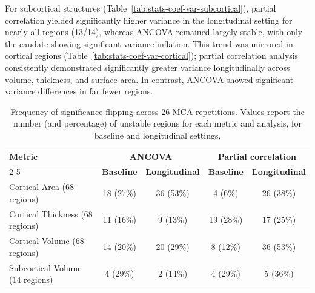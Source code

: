 For subcortical structures (Table~\ref{tab:stats-coef-var-subcortical}),
partial correlation yielded significantly higher variance in the longitudinal
setting for nearly all regions (13/14), whereas ANCOVA remained largely stable,
with only the caudate showing significant variance inflation. This trend was
mirrored in cortical regions (Table~\ref{tab:stats-coef-var-cortical}); partial
correlation analysis consistently demonstrated significantly greater variance
longitudinally across volume, thickness, and surface area. In contrast, ANCOVA
showed significant variance differences in far fewer regions.

\begin{table}[H]
    \centering
    \small
    \setlength{\tabcolsep}{6pt}
    \renewcommand{\arraystretch}{1.15}
    \caption{Frequency of significance flipping across 26 MCA repetitions.
        Values report the number (and percentage) of unstable regions for each
        metric and analysis, for baseline and longitudinal settings.\label{tab:fluctuating_regions}}
    \begin{tabular}{lcccc}
        \hline %
        \multirow{2}{*}{\textbf{Metric}}    &
        \multicolumn{2}{c}{\textbf{ANCOVA}} &
        \multicolumn{2}{c}{\textbf{Partial correlation}}                                                                            \\
        \cline{2-5}
                                            & \textbf{Baseline} & \textbf{Longitudinal} & \textbf{Baseline} & \textbf{Longitudinal} \\
        \hline %
        Cortical Area (68 regions)          & 18 (27\%)         & 36 (53\%)             & 4 (6\%)           & 26 (38\%)             \\
        Cortical Thickness (68 regions)     & 11 (16\%)         & 9 (13\%)              & 19 (28\%)         & 17 (25\%)             \\
        Cortical Volume (68 regions)        & 14 (20\%)         & 20 (29\%)             & 8 (12\%)          & 36 (53\%)             \\
        Subcortical Volume (14 regions)     & 4 (29\%)          & 2 (14\%)              & 4 (29\%)          & 5 (36\%)              \\
        \hline %
    \end{tabular}
\end{table}

